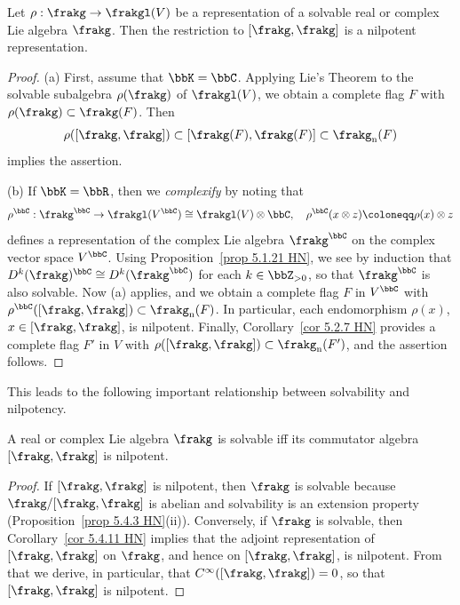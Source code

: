 \begin{cor}[{\cite[Cor.~5.4.11]{HN}}]\label{cor 5.4.11 HN}
    Let $\rho:\frakg\to\frakgl(V)$ be a representation of a solvable real or complex Lie algebra $\frakg$. Then the restriction to $[\frakg,\frakg]$ is a nilpotent representation.
\end{cor}
\begin{proof}
    (a) First, assume that $\bbK=\bbC$. Applying Lie's Theorem to the solvable subalgebra $\rho(\frakg)$ of $\frakgl(V)$, we obtain a complete flag $F$ with $\rho(\frakg)\subset \frakg(F)$. Then 
    \[\rho([\frakg,\frakg])\subset[\frakg(F),\frakg(F)]\subset\frakg_{\mathrm{n}}(F)\]
    implies the assertion.

    (b) If $\bbK=\bbR$, then we \emph{complexify} by noting that
    \[\rho^\bbC:\frakg^\bbC\to\frakgl(V^\bbC)\cong \frakgl(V)\otimes\bbC,\quad \rho^\bbC(x\otimes z)\coloneqq \rho(x)\otimes z\]
    defines a representation of the complex Lie algebra $\frakg^\bbC$ on the complex vector space $V^\bbC$. Using Proposition~\ref{prop 5.1.21 HN}, we see by induction that $D^k(\frakg)^\bbC\cong D^k(\frakg^\bbC)$ for each $k\in\bbZ_{>0}$, so that $\frakg^\bbC$ is also solvable. Now (a) applies, and we obtain a complete flag $F$ in $V^\bbC$ with $\rho^\bbC([\frakg,\frakg])\subset\frakg_{\mathrm{n}}(F)$. In particular, each endomorphism $\rho(x)$, $x\in[\frakg,\frakg]$, is nilpotent. Finally, Corollary~\ref{cor 5.2.7 HN} provides a complete flag $F'$ in $V$ with $\rho([\frakg,\frakg])\subset\frakg_{\mathrm{n}}(F')$, and the assertion follows.
\end{proof}

This leads to the following important relationship between solvability and nilpotency.

\begin{cor}[{\cite[Cor.~5.4.12]{HN}}]\label{cor 5.4.12 HN}
    A real or complex Lie algebra $\frakg$ is solvable iff its commutator algebra $[\frakg,\frakg]$ is nilpotent.
\end{cor}
\begin{proof}
    If $[\frakg,\frakg]$ is nilpotent, then $\frakg$ is solvable because $\frakg\slash[\frakg,\frakg]$ is abelian and solvability is an extension property (Proposition~\ref{prop 5.4.3 HN}(ii)). Conversely, if $\frakg$ is solvable, then Corollary~\ref{cor 5.4.11 HN} implies that the adjoint representation of $[\frakg,\frakg]$ on $\frakg$, and hence on $[\frakg,\frakg]$, is nilpotent. From that we derive, in particular, that $C^\infty([\frakg,\frakg])=0$, so that $[\frakg,\frakg]$ is nilpotent.
\end{proof}

